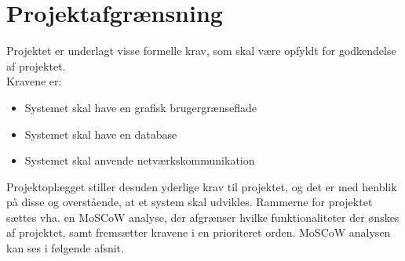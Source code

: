 \chapter{Projektafgrænsning}
Projektet er underlagt visse formelle krav, som skal være opfyldt for godkendelse af projektet. \\
Kravene er:
\begin{itemize}[noitemsep]
	\item Systemet skal have en grafisk brugergrænseflade
	\item Systemet skal have en database
	\item Systemet skal anvende netværkskommunikation
\end{itemize}

Projektoplægget stiller desuden yderlige krav til projektet, og det er med henblik på disse og overstående, at et system skal udvikles. Rammerne for projektet sættes vha. en MoSCoW analyse, der afgrænser hvilke funktionaliteter der ønskes af projektet, samt fremsætter kravene i en prioriteret orden. MoSCoW analysen kan ses i følgende afsnit.
%
